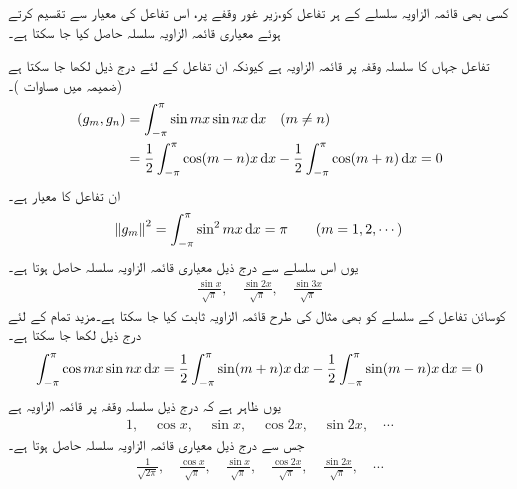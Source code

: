 کسی بھی قائمہ الزاویہ سلسلے کے ہر تفاعل کو،زیر غور وقفے پر، اس تفاعل کی  معیار سے تقسیم کرتے ہوئے معیاری قائمہ الزاویہ سلسلہ حاصل کیا جا سکتا ہے۔ 

تفاعل   جہاں  کا سلسلہ وقفہ  پر قائمہ الزاویہ ہے کیونکہ ان تفاعل کے لئے درج ذیل لکھا جا سکتا ہے (ضمیمہ  میں مساوات )۔
\begin{gather}
\begin{aligned}
(g_m,g_n)&=\int_{-\pi}^{\pi}\sin mx\sin nx\dif x\quad (m\ne n)\\
&=\frac{1}{2}\int_{-\pi}^{\pi}\cos(m-n)x\dif x-\frac{1}{2}\int_{-\pi}^{\pi}\cos(m+n)\dif x=0
\end{aligned}
\end{gather}
ان تفاعل کا معیار   ہے۔
\begin{align*}
\norm{g_m}^2=\int_{-\pi}^{\pi} \sin^2 mx\dif x=\pi\quad \quad (m=1,2,\cdots)
\end{align*} 
یوں اس سلسلے سے درج ذیل معیاری قائمہ الزاویہ سلسلہ حاصل ہوتا ہے۔
\begin{align*}
\frac{\sin x}{\sqrt{\pi}},\quad \frac{\sin 2x}{\sqrt{\pi}},\quad \frac{\sin 3x}{\sqrt{\pi}}
\end{align*} 
کوسائن تفاعل  کے سلسلے کو بھی مثال  کی طرح قائمہ الزاویہ ثابت کیا جا سکتا ہے۔مزید تمام  کے لئے درج ذیل لکھا جا سکتا ہے۔
\begin{align*}
\int_{-\pi}^{\pi} \cos mx \sin nx \dif x=\frac{1}{2}\int_{-\pi}^{\pi}\sin(m+n)x\dif x-\frac{1}{2}\int_{-\pi}^{\pi}\sin(m-n)x \dif x=0
\end{align*}
یوں ظاہر ہے کہ درج ذیل سلسلہ  وقفہ  پر قائمہ الزاویہ ہے
\begin{align*}
1,\quad \cos x,\quad \sin x,\quad \cos 2x,\quad \sin 2x,\quad \cdots
\end{align*}
جس سے درج ذیل معیاری قائمہ الزاویہ سلسلہ حاصل ہوتا ہے۔
\begin{align*}
\frac{1}{\sqrt{2\pi}},\quad \frac{\cos x}{\sqrt{\pi}},\quad \frac{\sin x}{\sqrt{\pi}},\quad \frac{\cos 2x}{\sqrt{\pi}},\quad \frac{\sin 2x}{\sqrt{\pi}},\quad \cdots
\end{align*}

